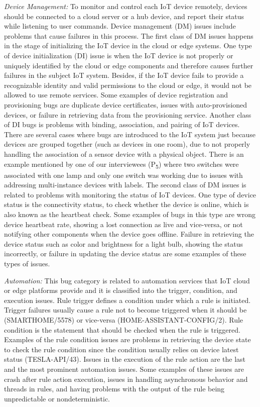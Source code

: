 \textit{Device Management:}
To monitor and control each IoT device remotely, devices should be connected to a cloud server or a hub device, and report their status while listening to user commands. Device management (DM) issues include problems that cause failures in this process. 
The first class of DM issues happens in the stage of initializing the IoT device in the cloud or edge systems. One type of device initialization (DI) issue is when the IoT device is not properly or uniquely identified by the cloud or edge components and therefore causes further failures in the subject IoT system. Besides, if the IoT device fails to provide a recognizable identity and valid permissions to the cloud or edge, it would not be allowed to use remote services. Some examples of device registration and provisioning bugs are duplicate device certificates, issues with auto-provisioned devices, or failure in retrieving data from the provisioning service. Another class of DI bugs is problems with binding, association, and pairing of IoT devices. There are several cases where bugs are introduced to the IoT system just because devices are grouped together (such as devices in one room), due to not properly handling the association of a sensor device with a physical object. There is an example mentioned by one of our interviewees (P\textsubscript{5}) where two switches were associated with one lamp and only one switch was working due to issues with addressing multi-instance devices with labels.
The second class of DM issues is related to problems with monitoring the status of IoT devices. One type of device status is the connectivity status, to check whether the device is online, which is also known as the heartbeat check. Some examples of bugs in this type are wrong device heartbeat rate, showing a lost connection as live and vice-versa, or not notifying other components when the device goes offline. Failure in retrieving the device status such as color and brightness for a light bulb, showing the status incorrectly, or failure in updating the device status are some examples of these types of issues.

\textit{Automation:}
This bug category is related to automation services that IoT cloud or edge platforms provide and it is classified into the trigger, condition, and execution issues. Rule trigger defines a condition under which a rule is initiated. Trigger failures usually cause a rule not to become triggered when it should be (SMARTHOME/5578) or vice-versa (HOME-ASSISTANT-CONFIG/2). Rule condition is the statement that should be checked when the rule is triggered. Examples of the rule condition issues are problems in retrieving the device state to check the rule condition since the condition usually relies on device latest status (TESLA-API/43). Issues in the execution of the rule action are the last and the most prominent automation issues. Some examples of these issues are crash after rule action execution, issues in handling asynchronous behavior and threads in rules, and having problems with the output of the rule being unpredictable or nondeterministic.

